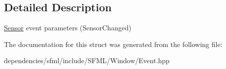\subsection{Detailed Description}
\hyperlink{classsf_1_1_sensor}{Sensor} event parameters (Sensor\+Changed) 

The documentation for this struct was generated from the following file\+:\begin{DoxyCompactItemize}
\item 
dependencies/sfml/include/\+S\+F\+M\+L/\+Window/Event.\+hpp\end{DoxyCompactItemize}
